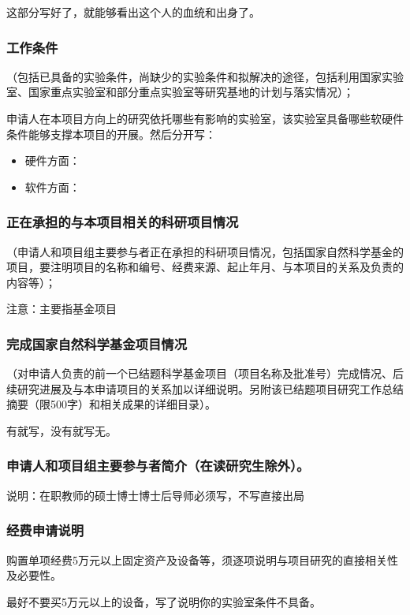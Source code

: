 这部分写好了，就能够看出这个人的血统和出身了。


\subsubsection{工作条件}
（包括已具备的实验条件，尚缺少的实验条件和拟解决的途径，包括利用国家实验室、国家重点实验室和部分重点实验室等研究基地的计划与落实情况）；

申请人在本项目方向上的研究依托哪些有影响的实验室，该实验室具备哪些软硬件条件能够支撑本项目的开展。然后分开写：
\begin{itemize}
\item 硬件方面：
\item 软件方面：
\end{itemize}



\subsubsection{正在承担的与本项目相关的科研项目情况}
（申请人和项目组主要参与者正在承担的科研项目情况，包括国家自然科学基金的项目，要注明项目的名称和编号、经费来源、起止年月、与本项目的关系及负责的内容等）；

注意：主要指基金项目



\subsubsection{完成国家自然科学基金项目情况}
（对申请人负责的前一个已结题科学基金项目（项目名称及批准号）完成情况、后续研究进展及与本申请项目的关系加以详细说明。另附该已结题项目研究工作总结摘要（限500字）和相关成果的详细目录）。

有就写，没有就写无。



\subsubsection{申请人和项目组主要参与者简介（在读研究生除外）。}
说明：在职教师的硕士博士博士后导师必须写，不写直接出局



\subsubsection{经费申请说明}
购置单项经费5万元以上固定资产及设备等，须逐项说明与项目研究的直接相关性及必要性。

最好不要买5万元以上的设备，写了说明你的实验室条件不具备。



